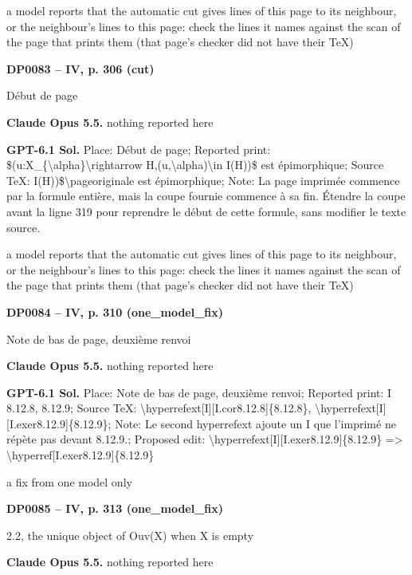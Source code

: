 a model reports that the automatic cut gives lines of this page to its neighbour, or the neighbour's lines to this page: check the lines it names against the scan of the page that prints them (that page's checker did not have their TeX)\par
\par\noindent\hypertarget{DP0083}{}\textbf{DP0083 -- IV, p. 306 (cut)}\par
Début de page\par
\textbf{Claude Opus 5.5.} nothing reported here\par
\textbf{GPT-6.1 Sol.} Place: Début de page; Reported print: \$(u:X\_\{\textbackslash{}alpha\}\textbackslash{}rightarrow H,(u,\textbackslash{}alpha)\textbackslash{}in I(H))\$ est épimorphique; Source TeX: I(H))\$\textbackslash{}pageoriginale est épimorphique; Note: La page imprimée commence par la formule entière, mais la coupe fournie commence à sa fin. Étendre la coupe avant la ligne 319 pour reprendre le début de cette formule, sans modifier le texte source.\par
a model reports that the automatic cut gives lines of this page to its neighbour, or the neighbour's lines to this page: check the lines it names against the scan of the page that prints them (that page's checker did not have their TeX)\par
\par\noindent\hypertarget{DP0084}{}\textbf{DP0084 -- IV, p. 310 (one\_model\_fix)}\par
Note de bas de page, deuxième renvoi\par
\textbf{Claude Opus 5.5.} nothing reported here\par
\textbf{GPT-6.1 Sol.} Place: Note de bas de page, deuxième renvoi; Reported print: I 8.12.8, 8.12.9; Source TeX: \textbackslash{}hyperrefext[I][I.cor8.12.8]\{8.12.8\}, \textbackslash{}hyperrefext[I][I.exer8.12.9]\{8.12.9\}; Note: Le second hyperrefext ajoute un I que l'imprimé ne répète pas devant 8.12.9.; Proposed edit: \textbackslash{}hyperrefext[I][I.exer8.12.9]\{8.12.9\} =\allowbreak > \textbackslash{}hyperref[I.exer8.12.9]\{8.12.9\}\par
a fix from one model only\par
\par\noindent\hypertarget{DP0085}{}\textbf{DP0085 -- IV, p. 313 (one\_model\_fix)}\par
2.2, the unique object of Ouv(X) when X is empty\par
\textbf{Claude Opus 5.5.} nothing reported here\par
